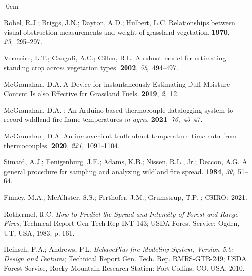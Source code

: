 \documentclass[fire,casereport,accept,moreauthors,pdftex]{Definitions/mdpi}  %
\begin{document}
\begin{adjustwidth}{-\extralength}{0cm}
\begin{thebibliography}{999}
Robel, R.J.; Briggs, J.N.; Dayton, A.D.; Hulbert, L.C.
\newblock Relationships between visual obstruction measurements and weight of
  grassland vegetation.
 {\bf 1970}, {\em 23},~295--297.

Vermeire, L.T.; Ganguli, A.C.; Gillen, R.L.
\newblock A robust model for estimating standing crop across vegetation types.
 {\bf 2002}, {\em 55},~494--497.

McGranahan, D.A.
\newblock A Device for Instantaneously Estimating Duff Moisture Content Is also
  Effective for Grassland Fuels.
 {\bf 2019}, {\em 2},~{12}.

McGranahan, D.A.
: {An} {Arduino}-based thermocouple datalogging system
  to record wildland fire flame temperatures \textit{in agris}.
 {\bf 2021}, {\em 76},~43--47.

McGranahan, D.A.
\newblock An inconvenient truth about temperature–time data from
  thermocouples.
 {\bf 2020}, {\em 221},~1091--1104.

Simard, A.J.; Eenigenburg, J.E.; Adams, K.B.; Nissen, R.L., Jr.; Deacon, A.G.
\newblock A general procedure for sampling and analyzing wildland fire spread.
 {\bf 1984}, {\em 30},~51--64.

Finney, M.A.; McAllister, S.S.; Forthofer, J.M.; Grumstrup, T.P.
;
  {CSIRO:}~2021.

Rothermel, R.C.
\newblock \emph{How to Predict the Spread and Intensity of Forest and Range Fires};
\newblock Technical Report Gen Tech Rep INT-143; USDA Forest Service: {Ogden,
  UT,  USA, 1983; p. 161}.

Heinsch, F.A.; Andrews, P.L.
\newblock \emph{BehavePlus fire Modeling System, Version 5.0: Design and Features};
\newblock Technical Report Gen. Tech. Rep. RMRS-GTR-249; USDA Forest Service,
  Rocky Mountain Research Station: Fort Collins, CO, USA, 2010.


\end{thebibliography}
\end{adjustwidth}
\end{document}
